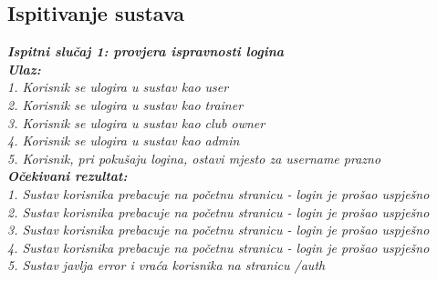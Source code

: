			

			\subsection{Ispitivanje sustava}
			
			\textbf{\textit{Ispitni slučaj 1: provjera ispravnosti logina}}\\

			\textbf{\textit{Ulaz:}}\\
			 \textit{1. Korisnik se ulogira u sustav kao user}\\
			 \textit{2. Korisnik se ulogira u sustav kao trainer}\\
			 \textit{3. Korisnik se ulogira u sustav kao club owner}\\
			 \textit{4. Korisnik se ulogira u sustav kao admin}\\
			 \textit{5. Korisnik, pri pokušaju logina, ostavi mjesto za username prazno}\\

			 \textbf{\textit{Očekivani rezultat:}}\\
			 \textit{1. Sustav korisnika prebacuje na početnu stranicu - login je prošao uspješno}\\
			 \textit{2. Sustav korisnika prebacuje na početnu stranicu - login je prošao uspješno}\\
			 \textit{3. Sustav korisnika prebacuje na početnu stranicu - login je prošao uspješno}\\
			 \textit{4. Sustav korisnika prebacuje na početnu stranicu - login je prošao uspješno}\\
			 \textit{5. Sustav javlja error i vraća korisnika na stranicu /auth}\\

